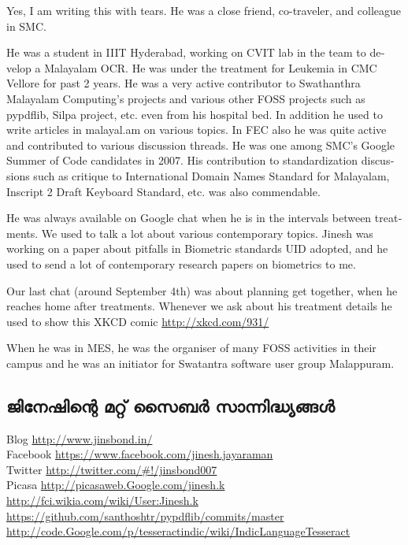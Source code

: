\enlargethispage*{3\baselineskip}
\begin{english}
Yes, I am writing this with tears. He was a close friend,
co-traveler, and colleague in SMC.

He was a student in IIIT Hyderabad, working on CVIT lab in the team
to develop a Malayalam OCR. He was under the treatment for Leukemia in
CMC Vellore for past 2 years. He was a very active contributor to
Swathanthra Malayalam Computing's projects and various other FOSS
projects such as pypdflib, Silpa project, etc. even from his hospital
bed. In addition he used to write articles in malayal.am on various
topics. In FEC also he was quite active and contributed to various
discussion threads. He was one among SMC's  Google Summer of Code
candidates in 2007. His contribution to standardization discussions
such as critique to International Domain Names Standard for Malayalam,
Inscript 2 Draft Keyboard Standard, etc. was also commendable.

He was always available on Google chat when he is in the intervals
between treatments. We used to talk a lot about various contemporary
topics. Jinesh was working on a paper about pitfalls in Biometric
standards UID adopted, and he used to send a lot of contemporary
research papers on biometrics to me.

Our last chat (around September 4th) was about planning get together, when
he reaches home after treatments.
Whenever we ask about his treatment details he used to show this XKCD comic
\url{http://xkcd.com/931/}

When he was in MES, he was the organiser of many FOSS activities in
their campus and he was an initiator for Swatantra software user group
Malappuram.
\end{english}

\subsection*{ജിനേഷിന്റെ മറ്റ് സൈബര്‍ സാന്നിദ്ധ്യങ്ങള്‍}
Blog \url{http://www.jinsbond.in/} \\
Facebook \url{https://www.facebook.com/jinesh.jayaraman} \\
Twitter \url{http://twitter.com/#!/jinsbond007} \\
Picasa \url{http://picasaweb.Google.com/jinesh.k} \\
\url{http://fci.wikia.com/wiki/User:Jinesh.k} \\
\url{https://github.com/santhoshtr/pypdflib/commits/master} \\
\url{http://code.Google.com/p/tesseractindic/wiki/IndicLanguageTesseract}
\newpage
